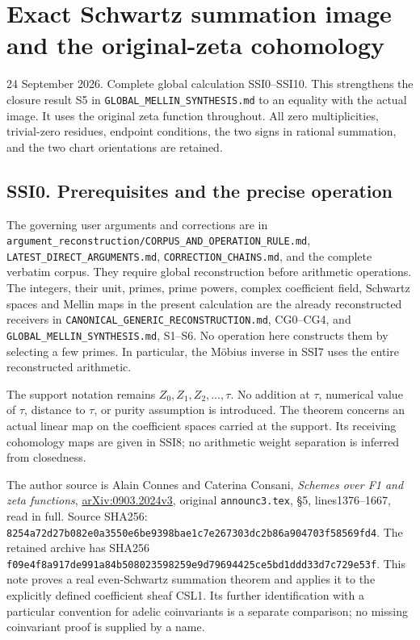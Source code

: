 \section{Exact Schwartz summation image and the original-zeta
cohomology}\label{exact-schwartz-summation-image-and-the-original-zeta-cohomology}

24 September 2026. Complete global calculation SSI0--SSI10. This
strengthens the closure result S5 in
\texttt{GLOBAL\_MELLIN\_SYNTHESIS.md} to an equality with the actual
image. It uses the original zeta function throughout. All zero
multiplicities, trivial-zero residues, endpoint conditions, the two
signs in rational summation, and the two chart orientations are
retained.

\subsection{SSI0. Prerequisites and the precise
operation}\label{ssi0.-prerequisites-and-the-precise-operation}

The governing user arguments and corrections are in
\nolinkurl{argument_reconstruction/CORPUS_AND_OPERATION_RULE.md},
\texttt{LATEST\_DIRECT\_ARGUMENTS.md}, \texttt{CORRECTION\_CHAINS.md},
and the complete verbatim corpus. They require global reconstruction
before arithmetic operations. The integers, their unit, primes, prime
powers, complex coefficient field, Schwartz spaces and Mellin maps in
the present calculation are the already reconstructed receivers in
\nolinkurl{CANONICAL_GENERIC_RECONSTRUCTION.md}, CG0--CG4, and
\texttt{GLOBAL\_MELLIN\_SYNTHESIS.md}, S1--S6. No operation here
constructs them by selecting a few primes. In particular, the Möbius
inverse in SSI7 uses the entire reconstructed arithmetic.

The support notation remains \(Z_0,Z_1,Z_2,\ldots,\tau\). No addition at
\(\tau\), numerical value of \(\tau\), distance to \(\tau\), or purity
assumption is introduced. The theorem concerns an actual linear map on
the coefficient spaces carried at the support. Its receiving cohomology
maps are given in SSI8; no arithmetic weight separation is inferred from
closedness.

The author source is Alain Connes and Caterina Consani, \emph{Schemes
over F1 and zeta functions},
\href{https://arxiv.org/abs/0903.2024v3}{arXiv:0903.2024v3}, original
\texttt{announc3.tex}, §5, lines1376--1667, read in full. Source SHA256:
\nolinkurl{8254a72d27b082e0a3550e6be9398bae1c7e267303dc2b86a904703f58569fd4}.
The retained archive has SHA256
\nolinkurl{f09e4f8a917de991a84b508023598259e9d79694425ce5bd1ddd33d7c729e53f}.
This note proves a real even-Schwartz summation theorem and applies it
to the explicitly defined coefficient sheaf CSL1. Its further
identification with a particular convention for adelic coinvariants is a
separate comparison; no missing coinvariant proof is supplied by a name.

